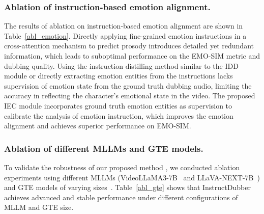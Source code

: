 \subsubsection{Ablation of instruction-based emotion alignment.}
The results of ablation on instruction-based emotion alignment are shown in Table~\ref{abl_emotion}.
Directly applying fine-grained emotion instructions in a cross-attention mechanism to predict prosody introduces detailed yet redundant information, which leads to suboptimal performance on the EMO-SIM metric and dubbing quality.
Using the instruction distilling method similar to the IDD module or directly extracting emotion entities from the instructions lacks supervision of emotion state from the ground truth dubbing audio, limiting the accuracy in reflecting the character’s emotional state in the video.
The proposed IEC module incorporates ground truth emotion entities as supervision to calibrate the analysis of emotion instruction, which improves the emotion alignment and achieves superior performance on EMO-SIM.



\subsubsection{Ablation of different MLLMs and GTE models.}
To validate the robustness of our proposed method
, we conducted ablation experiments using different MLLMs (VideoLLaMA3-7B~\cite{videollama3} and LLaVA-NEXT-7B~\cite{llavanext}) and GTE models of varying sizes~\cite{qwen3-embedding}.
Table~\ref{abl_gte} shows that InstructDubber achieves advanced and stable performance
under different configurations of MLLM and GTE size.



